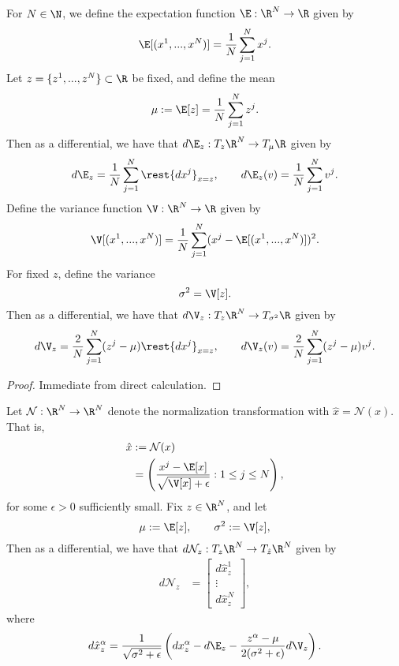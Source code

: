


\begin{lem}
	For $N\in\N$, we define the expectation function $\E:\R^N\to\R$ given by
	$$\E[(x^1,...,x^N)]=\frac{1}{N}\sum_{j=1}^Nx^j.$$
	Let $z=\{z^1,...,z^N\}\subset\R$ be fixed, and define the mean
	$$\mu:=\E[z]=\frac{1}{N}\sum_{j=1}^Nz^j.$$
	Then as a differential, we have that $d\E_z:T_z\R^N\to T_\mu\R$ given by
	$$d\E_z=\frac{1}{N}\sum_{j=1}^N\rest{dx^j}_{x=z},\qquad d\E_z(v)=\frac{1}{N}\sum_{j=1}^Nv^j.$$
	Define the variance function $\V:\R^N\to\R$ given by
	$$\V[(x^1,...,x^N)]=\frac{1}{N}\sum_{j=1}^N(x^j-\E[(x^1,...,x^N)])^2.$$
	For fixed $z$, define the variance
	$$\sigma^2=\V[z].$$
	Then as a differential, we have that $d\V_z:T_z\R^N\to T_{\sigma^2}\R$ given by
	$$d\V_z=\frac{2}{N}\sum_{j=1}^N(z^j-\mu)\rest{dx^j}_{x=z},\qquad d\V_z(v)=\frac{2}{N}\sum_{j=1}^N(z^j-\mu)v^j.$$
\end{lem}

\begin{proof}
	Immediate from direct calculation.
\end{proof}

\begin{lem}
	Let $\mathcal{N}:\R^N\to\R^N$ denote the normalization transformation with $\hat{x}=\mathcal{N}(x)$.  That is,
	\begin{align*}
		\hat{x}&:=\mathcal{N}(x)\\
		&=\left(\frac{x^j-\E[x]}{\sqrt{\V[x]+\epsilon}}:1\leq j\leq N\right),
	\end{align*}
	for some $\epsilon>0$ sufficiently small.  Fix $z\in\R^N$, and let
	$$\mu:=\E[z],\qquad\sigma^2:=\V[z],$$
	Then as a differential, we have that $d\mathcal{N}_z:T_z\R^N\to T_{\hat{z}}\R^N$ given by
	\begin{align*}
		d\mathcal{N}_z&=\begin{bmatrix}
			d\hat{x}^1_z\\
			\vdots\\
			d\hat{x}^N_z
		\end{bmatrix},
	\end{align*}
	where
	$$d\hat{x}^\alpha_z=\frac{1}{\sqrt{\sigma^2+\epsilon}}\left(dx^\alpha_z-d\E_z-\frac{z^\alpha-\mu}{2(\sigma^2+\epsilon)}d\V_z\right).$$
\end{lem}

